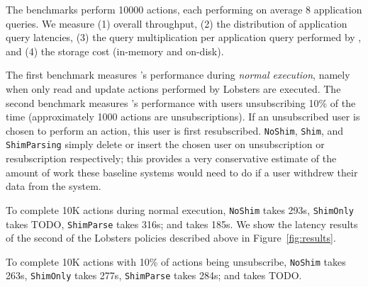 The benchmarks perform 10000 actions, each performing on average 8 application queries. 
We measure (1) overall throughput, (2) the distribution of application query
latencies, (3) the query multiplication per application query performed by \sys, and (4) the
storage cost (in-memory and on-disk).

The first benchmark measures \sys's performance during \emph{normal execution}, namely when only
read and update actions performed by Lobsters are executed. 
The second benchmark measures \sys's performance with users unsubscribing 10\% of the time
(approximately 1000 actions are unsubscriptions). If an unsubscribed user is chosen to perform an action, this user is first resubscribed.
\texttt{NoShim}, \texttt{Shim}, and \texttt{ShimParsing} simply delete or insert the chosen user on
unsubscription or resubscription respectively; this provides a very conservative estimate of the
amount of work these baseline systems would need to do if a user withdrew their data from the system.

To complete 10K actions during normal execution, \texttt{NoShim} takes 293s, \texttt{ShimOnly} takes
TODO, \texttt{ShimParse} takes 316s; and \texttt{\sys} takes 185s.
We show the latency results of the second of the Lobsters policies described above in
Figure~\ref{fig:results}. 

To complete 10K actions with 10\% of actions being unsubscribe, \texttt{NoShim} takes 263s, \texttt{ShimOnly} takes 277s, \texttt{ShimParse}
takes 284s; and \texttt{\sys} takes TODO.
\fi
